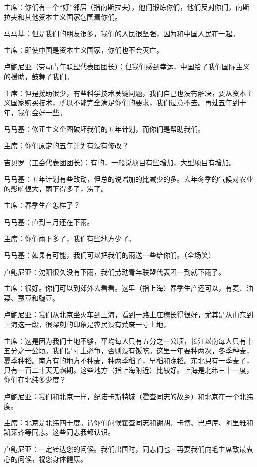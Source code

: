 主席：你们有一个“好”邻居（指南斯拉夫），他们锻炼你们，他们反对你们，南斯拉夫和其他资本主义国家包围着你们。

马马基：但是我们的朋友很多，我们的人民很坚强，因为和中国人民在一起。

主席：即使中国是资本主义国家，你们也不会灭亡。

卢鲍尼亚（劳动青年联盟代表团团长）：但我们感到幸运，中国给了我们国际主义的援助，鼓舞了我们。

主席：但是援助很少，有些科学技术关键问题，我们自己也没有解决，要从资本主义国家购买技术，所以不能完全满足你们的要求，我们过意不去。再过五年到十年，我们会好一些。

马马基：修正主义企图破坏我们的五年计划，而你们是帮助我们。

主席：你们原定的五年计划有没有修改？

吉贝罗（工会代表团团长）：有的，一般说项目有些增加，大型项目有增加。

马马基：五年计划有些改动，但总的说增加的比减少的多。去年冬季的气候对农业的影响很大，雨下得多了，涝了。

主席：春季生产怎样了？

马马基：直到三月还在下雨。

主席：你们雨下多了，我们有些地方少了。

马马基：如果有可能，我们可以把我们的雨送一些给你们。（全场笑）

卢鲍尼亚：沈阳很久没有下雨，我们劳动青年联盟代表团一到就下雨了。

主席：很好。你们可以到郊外去看看。这里（指上海）春季生产还可以，有麦、油菜、蚕豆和豌豆。

卢鲍尼亚：我们从北京坐火车到上海，看到一路上庄稼长得很好，尤其是从山东到上海这一段，很深刻的印象是农民没有荒废一寸土地。

主席：这是因为我们土地不够，平均每人只有五分之一公顷，长江以南每人只有十五分之一公顷。我们是寸土必争，否则没有饭吃。这里一年要种两次，冬季种麦，夏季种稻。南方有的地方不种麦，种两季稻子，早稻和晚稻。东北只有一季麦子，只有一百二十天无霜期。这些地方（指上海附近）比较好。上海是北纬三十一度，你们在北纬多少度？

卢鲍尼亚：我们和北京一样，纪诺卡斯特城（霍查同志的故乡）和北京在一个北纬度。

主席：北京是北纬四十度。请你们问候霍查同志和谢胡、卡博、巴卢库、阿里雅和凯莱齐等同志。这些同志我都认识。

卢鲍尼亚：一定转达您的问候。我们出国时，同志们也一再要我们向毛主席致最衷心的问候，祝您身体健康。

